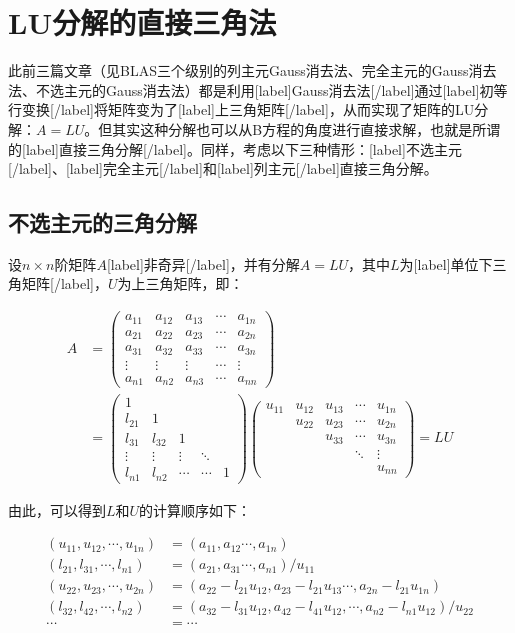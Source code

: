 \documentclass[UTF8,nofonts]{ctexart}
\begin{document}
\section*{LU分解的直接三角法}

此前三篇文章（见BLAS三个级别的列主元Gauss消去法、完全主元的Gauss消去法、不选主元的Gauss消去法）都是利用[label]Gauss消去法[/label]通过[label]初等行变换[/label]将矩阵变为了[label]上三角矩阵[/label]，从而实现了矩阵的LU分解：$A=LU$。但其实这种分解也可以从B方程的角度进行直接求解，也就是所谓的[label]直接三角分解[/label]。同样，考虑以下三种情形：[label]不选主元[/label]、[label]完全主元[/label]和[label]列主元[/label]直接三角分解。

\subsection*{不选主元的三角分解}

设$n \times n$阶矩阵$A$[label]非奇异[/label]，并有分解$A=LU$，其中$L$为[label]单位下三角矩阵[/label]，$U$为上三角矩阵，即：

\begin{align*}
A &= 
\begin{pmatrix}a_{11}&a_{12}&a_{13}&\cdots&a_{1n}\\a_{21}&a_{22}&a_{23}&\cdots&a_{2n}\\a_{31}&a_{32}&a_{33}&\cdots&a_{3n}\\\vdots&\vdots&\vdots&\cdots&\vdots\\a_{n1}&a_{n2}&a_{n3}&\cdots&a_{nn}\end{pmatrix} \\
 &=
\begin{pmatrix}1&&&\\l_{21}&1&&&\\l_{31}&l_{32}&1&&\\\vdots&\vdots&\vdots&\ddots&\\l_{n1}&l_{n2}&\cdots&\cdots&1\end{pmatrix}
\begin{pmatrix}u_{11}&u_{12}&u_{13}&\cdots&u_{1n}\\&u_{22}&u_{23}&\cdots&u_{2n}\\&&u_{33}&\cdots&u_{3n}\\&&&\ddots&\vdots\\&&&&u_{nn}\end{pmatrix}=LU
\end{align*}

由此，可以得到$L$和$U$的计算顺序如下：

\begin{align*}
(u_{11},u_{12},\cdots,u_{1n}) &= (a_{11},a_{12}\cdots,a_{1n}) \\
(l_{21},l_{31},\cdots,l_{n1}) &= (a_{21},a_{31}\cdots,a_{n1})/u_{11} \\
(u_{22},u_{23},\cdots,u_{2n}) &= (a_{22}-l_{21}u_{12},a_{23}-l_{21}u_{13}\cdots,a_{2n}-l_{21}u_{1n}) \\
(l_{32},l_{42},\cdots,l_{n2}) &= (a_{32}-l_{31}u_{12},a_{42}-l_{41}u_{12},\cdots,a_{n2}-l_{n1}u_{12})/u_{22} \\
\cdots &= \cdots
\end{align*}
\end{document}
